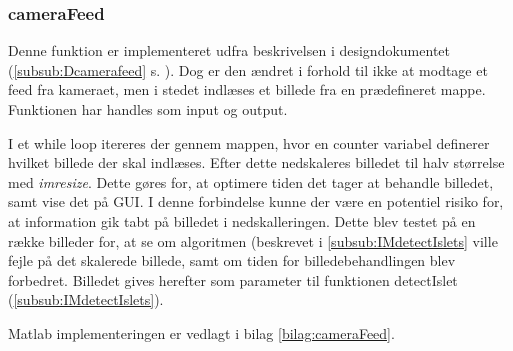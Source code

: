\subsubsection{cameraFeed} \label{subsub:camfeed}
Denne funktion er implementeret udfra beskrivelsen i designdokumentet (\ref{subsub:Dcamerafeed} s. \pageref{subsub:Dcamerafeed}). Dog er den ændret i forhold til ikke at modtage et feed fra kameraet, men i stedet indlæses et billede fra en prædefineret mappe. 
Funktionen har handles som input og output. 

I et while loop itereres der gennem mappen, hvor en counter variabel definerer hvilket billede der skal indlæses. Efter dette nedskaleres billedet til halv størrelse med \textit{imresize}. Dette gøres for, at optimere tiden det tager at behandle billedet, samt vise det på GUI. I denne forbindelse kunne der være en potentiel risiko for, at information gik tabt på billedet i nedskalleringen. Dette blev testet på en række billeder for, at se om algoritmen (beskrevet i \ref{subsub:IMdetectIslets} ville fejle på det skalerede billede, samt om tiden for billedebehandlingen blev forbedret.  Billedet gives herefter som parameter til funktionen detectIslet (\ref{subsub:IMdetectIslets}). %

Matlab implementeringen er vedlagt i bilag \ref{bilag:cameraFeed}.